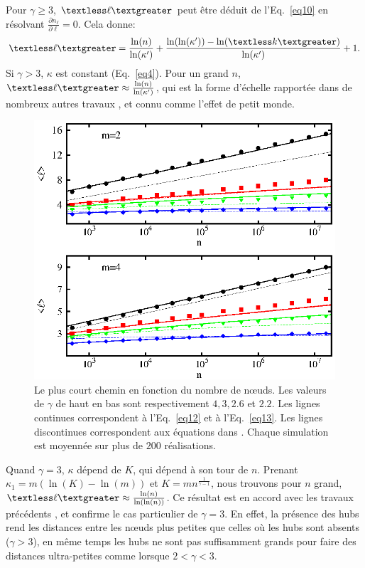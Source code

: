 Pour $\gamma\ge 3 $, $\textless \ell \textgreater$ peut être déduit de l'Eq.~\eqref{eq10} en résolvant $\frac{\partial n_{\ell}}{\partial\ell}=0$. Cela donne:
\begin{align}
	\textless \ell \textgreater=\frac{\ln (n)}{\ln(\kappa')}+\frac{\ln(\ln(\kappa'))-\ln(\km)}{\ln(\kappa')}+1.
	\label{eq13}
\end{align}
Si $\gamma>3$, $\kappa$ est constant (Eq.~\eqref{eq4}). Pour un grand $n$, $\textless\ell\textgreater\approx\frac{\ln(n)} {\ln(\kappa')}$, qui est la forme d'échelle rapportée dans de nombreux autres travaux \cite{Bollobas1985,Chung-Lu2002,Fronczak-al2004,Hofstad-al2004,Cohen-Havlin2009}, et connu comme l'effet de petit monde. \\
 \begin{figure}[h]
 	\centering
 	\includegraphics[scale=1.3]{./figures/fig4-3}
 	\caption{Le plus court chemin en fonction du nombre de nœuds. Les valeurs de $\gamma$ de haut en bas sont respectivement $ 4, 3, 2.6 $ et $ 2.2 $. Les lignes continues correspondent à l'Eq.~\eqref{eq12} et à l'Eq.~\eqref{eq13}. Les lignes discontinues correspondent aux équations dans \cite{Fronczak-al2004}. Chaque simulation est moyennée sur plus de $200$ réalisations.}
 	\label{fig4-3}
 \end{figure}
Quand $\gamma=3$, $\kappa$ dépend de $K$, qui dépend à son tour de $n$. Prenant $\kappa_1=m(\ln(K)-\ln(m))$ et $K=mn^{\frac{1}{\gamma-1}}$, nous trouvons pour  $n$ grand, $\textless\ell\textgreater\approx \frac{\ln(n)} {\ln(\ln(n))} $. Ce résultat est en accord avec les travaux précédents \cite {Chung-Lu2002,Cohen-Havlin2003,Fronczak-al2004,Bollobas-Riodan2002}, et confirme le cas particulier de $ \gamma = 3 $. En effet, la présence des hubs rend les distances entre les nœuds plus petites que celles où les hubs sont absents ($\gamma>3$), en même temps les hubs ne sont pas suffisamment grands pour faire des distances ultra-petites comme lorsque $2<\gamma<3$.\\  
